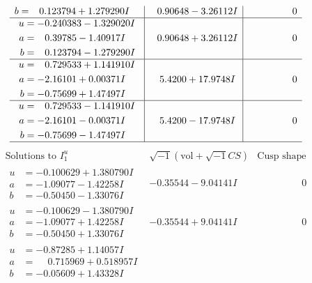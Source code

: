 \documentclass[1p]{elsarticle_modified}
\theoremstyle{definition}
\newcommand{\I}{\sqrt{-1}}
\begin{document}
$$\begin{array}{c|c|c}
\begin{aligned}
b &= \phantom{-}0.123794 + 1.279290 I\end{aligned}
 & \phantom{-}0.90648 - 3.26112 I & \phantom{-0.000000 } 0 \\ \hline\begin{aligned}
u &= -0.240383 - 1.329020 I \\
a &= \phantom{-}0.39785 - 1.40917 I \\
b &= \phantom{-}0.123794 - 1.279290 I\end{aligned}
 & \phantom{-}0.90648 + 3.26112 I & \phantom{-0.000000 } 0 \\ \hline\begin{aligned}
u &= \phantom{-}0.729533 + 1.141910 I \\
a &= -2.16101 + 0.00371 I \\
b &= -0.75699 + 1.47497 I\end{aligned}
 & \phantom{-}5.4200 + 17.9748 I & \phantom{-0.000000 } 0 \\ \hline\begin{aligned}
u &= \phantom{-}0.729533 - 1.141910 I \\
a &= -2.16101 - 0.00371 I \\
b &= -0.75699 - 1.47497 I\end{aligned}
 & \phantom{-}5.4200 - 17.9748 I & \phantom{-0.000000 } 0\\
 \hline 
 \end{array}$$\newpage$$\begin{array}{c|c|c}  
\text{Solutions to }I^u_{1}& \I (\text{vol} + \sqrt{-1}CS) & \text{Cusp shape}\\
 \hline 
\begin{aligned}
u &= -0.100629 + 1.380790 I \\
a &= -1.09077 - 1.42258 I \\
b &= -0.50450 - 1.33076 I\end{aligned}
 & -0.35544 - 9.04141 I & \phantom{-0.000000 } 0 \\ \hline\begin{aligned}
u &= -0.100629 - 1.380790 I \\
a &= -1.09077 + 1.42258 I \\
b &= -0.50450 + 1.33076 I\end{aligned}
 & -0.35544 + 9.04141 I & \phantom{-0.000000 } 0 \\ \hline\begin{aligned}
u &= -0.87285 + 1.14057 I \\
a &= \phantom{-}0.715969 + 0.518957 I \\
b &= -0.05609 + 1.43328 I\end{aligned}

\end{array}$$
\end{document}
